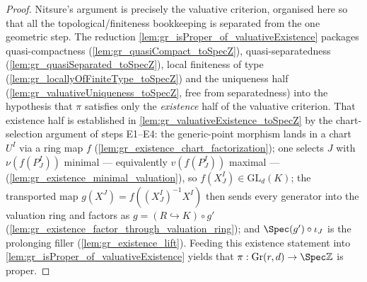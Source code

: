 \begin{proof}
  \leanok
  Nitsure's argument is precisely the valuative criterion, organised here so that
  all the topological/finiteness bookkeeping is separated from the one geometric
  step. The reduction \cref{lem:gr_isProper_of_valuativeExistence} packages
  quasi-compactness (\cref{lem:gr_quasiCompact_toSpecZ}), quasi-separatedness
  (\cref{lem:gr_quasiSeparated_toSpecZ}), local finiteness of type
  (\cref{lem:gr_locallyOfFiniteType_toSpecZ}) and the uniqueness half
  (\cref{lem:gr_valuativeUniqueness_toSpecZ}, free from separatedness) into the
  hypothesis that \(\pi\) satisfies only the \emph{existence} half of the valuative
  criterion. That existence half is established in
  \cref{lem:gr_valuativeExistence_toSpecZ} by the chart-selection argument of steps
  E1--E4: the generic-point morphism lands in a chart \(U^I\) via a ring map \(f\)
  (\cref{lem:gr_existence_chart_factorization}); one selects \(J\) with
  \(\nu(f(P^I_J))\) minimal --- equivalently \(v(f(P^I_J))\) maximal ---
  (\cref{lem:gr_existence_minimal_valuation}), so \(f(X^I_J) \in \mathrm{GL}_d(K)\);
  the transported map \(g(X^J) = f((X^I_J)^{-1} X^I)\) then sends every generator
  into the valuation ring and factors as \(g = (R \hookrightarrow K)\circ g'\)
  (\cref{lem:gr_existence_factor_through_valuation_ring}); and \(\Spec(g') \circ
  \iota_J\) is the prolonging filler (\cref{lem:gr_existence_lift}). Feeding this
  existence statement into \cref{lem:gr_isProper_of_valuativeExistence} yields that
  \(\pi : \mathrm{Gr}(r,d) \to \Spec \mathbb{Z}\) is proper.
\end{proof}


